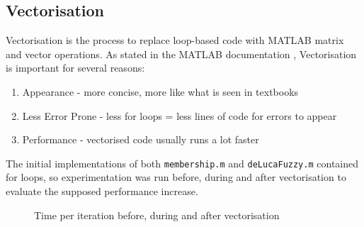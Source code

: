\subsection{Vectorisation}
\label{ssec:vectorisation}

Vectorisation is the process to replace loop-based code with MATLAB matrix and vector operations. As stated in the MATLAB documentation \cite{vectorisation}, Vectorisation is important for several reasons:

\begin{enumerate}
    \item Appearance - more concise, more like what is seen in textbooks
    \item Less Error Prone - less for loops = less lines of code for errors to appear
    \item Performance - vectorised code usually runs a lot faster
\end{enumerate}

The initial implementations of both \texttt{membership.m} and \texttt{deLucaFuzzy.m} contained for loops, so experimentation was run before, during and after vectorisation to evaluate the supposed performance increase.

\begin{figure}[H]
  \centering
    \caption{Time per iteration before, during and after vectorisation}
    \label{fig:time-per-iteration}
\end{figure}

